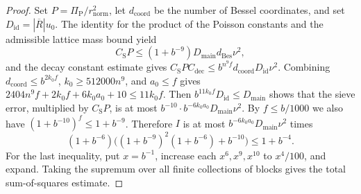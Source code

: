 \begin{proof}
Set $P=\Pi_{\mathrm P}/r_{\mathrm{norm}}^2$, let $d_{\mathrm{coord}}$ be the number of Bessel coordinates, and set
$D_{\mathrm{id}}=|\overline R|u_0$. The identity for the product of the Poisson constants and the admissible lattice mass bound yield
\[
 C_{\mathrm S}P\le(1+b^{-9})D_{\mathrm{main}}d_{\mathrm{Bes}}\nu^2 ,
\]
and the decay constant estimate gives
$C_{\mathrm S}PC_{\mathrm{dec}}\le b^{n^9f}d_{\mathrm{coord}}D_{\mathrm{id}}\nu^2$.
Combining $d_{\mathrm{coord}}\le b^{2k_0f}$, $k_0\ge512000n^9$, and $a_0\le f$ gives
$2404n^9f+2k_0f+6k_0a_0+10\le11k_0f$.
Then $b^{11k_0f}D_{\mathrm{id}}\le D_{\mathrm{main}}$ shows that the sieve error, multiplied by
$C_{\mathrm S}P$, is at most $b^{-10}\cdot b^{-6k_0a_0}D_{\mathrm{main}}\nu^2$.
By $f\le b/1000$ we also have $(1+b^{-10})^f\le1+b^{-9}$.
Therefore $I$ is at most $b^{-6k_0a_0}D_{\mathrm{main}}\nu^2$ times
\[
 (1+b^{-6})\bigl((1+b^{-9})^2(1+b^{-6})+b^{-10}\bigr)\le1+b^{-4}.
\]
For the last inequality, put $x=b^{-1}$, increase each $x^6,x^9,x^{10}$ to $x^4/100$, and expand.
Taking the supremum over all finite collections of blocks gives the total sum-of-squares estimate.
\end{proof}

